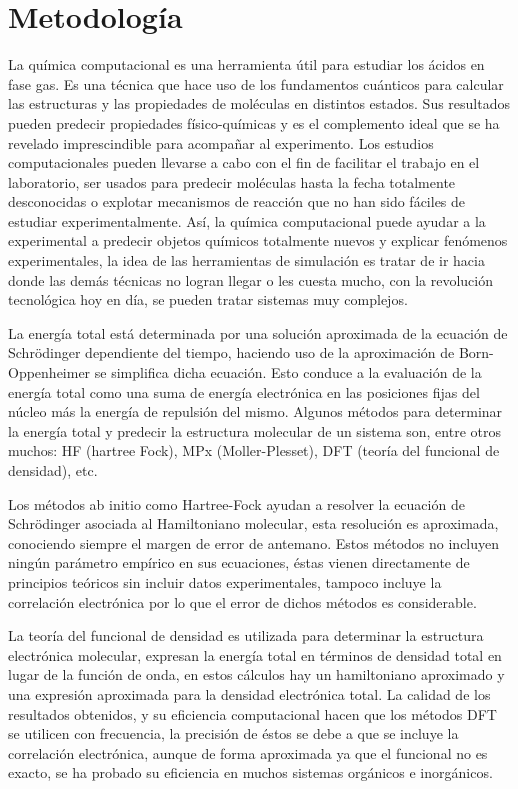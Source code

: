 \chapter{Metodología}

La química computacional es una herramienta útil para estudiar los ácidos en fase gas. Es una técnica que hace uso de los fundamentos cuánticos para calcular las estructuras y las propiedades de moléculas en distintos estados. Sus resultados pueden predecir propiedades físico-químicas y es el complemento ideal que se ha revelado imprescindible para acompañar al experimento. Los estudios computacionales pueden llevarse a cabo con el fin de facilitar el trabajo en el laboratorio, ser usados para predecir moléculas hasta la fecha totalmente desconocidas o explotar mecanismos de reacción que no han sido fáciles de estudiar experimentalmente. Así, la química computacional puede ayudar a la experimental a predecir objetos químicos totalmente nuevos y explicar fenómenos experimentales, la idea de las herramientas de simulación es tratar de ir hacia donde las demás técnicas no logran llegar o les cuesta mucho, con la revolución tecnológica hoy en día, se pueden tratar sistemas muy complejos.

La energía total está determinada por una solución aproximada de la ecuación de Schrödinger dependiente del tiempo, haciendo uso de la aproximación de Born-Oppenheimer se simplifica dicha ecuación. Esto conduce a la evaluación de la energía total como una suma de energía electrónica en las posiciones fijas del núcleo más la energía de repulsión del mismo. Algunos métodos para determinar la energía total y predecir la estructura molecular de un sistema son, entre otros muchos: HF (hartree Fock), MPx (Moller-Plesset), DFT (teoría del funcional de densidad), etc.

Los métodos ab initio como Hartree-Fock ayudan a resolver la ecuación de Schrödinger asociada al Hamiltoniano molecular, esta resolución es aproximada, conociendo siempre el margen de error de antemano. Estos métodos no incluyen ningún parámetro empírico en sus ecuaciones, éstas vienen directamente de principios teóricos sin incluir datos experimentales, tampoco incluye la correlación electrónica por lo que el error de dichos métodos es considerable.\cite {quimica2}

La teoría del funcional de densidad es utilizada para determinar la estructura electrónica molecular, expresan la energía total en términos de densidad total en lugar de la función de onda, en estos cálculos hay un hamiltoniano aproximado y una expresión aproximada para la densidad electrónica total. La calidad de los resultados obtenidos, y su eficiencia computacional hacen que los métodos DFT se utilicen con frecuencia, la precisión de éstos se debe a que se incluye la correlación electrónica, aunque de forma aproximada ya que el funcional no es exacto, se ha probado su eficiencia en muchos sistemas orgánicos e inorgánicos. \cite{quimica9} \cite {quimica2}

